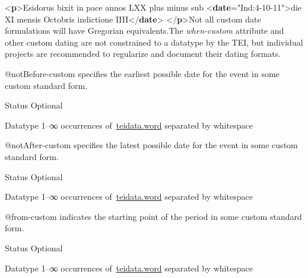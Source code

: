 \begin{reflist}
\begin{sansreflist}
\begin{reflist}
{<\textbf{p}>}Esidorus bixit in pace annos LXX plus minus sub\mbox{}\newline 
{<\textbf{date}\hspace*{1em}{when-custom}="{Ind:4-10-11}">}die XI mensis Octobris indictione IIII{</\textbf{date}>}\mbox{}\newline 
{</\textbf{p}>}Not all custom date formulations will have Gregorian equivalents.The {\itshape when-custom} attribute and other custom dating are not constrained to a datatype by the TEI, but individual projects are recommended to regularize and document their dating formats.
\end{reflist}  
    \item[@notBefore-custom]
  specifies the earliest possible date for the event in some custom standard form.
\begin{reflist}
    \item[{Status}]
  Optional
    \item[{Datatype}]
  1–∞ occurrences of \hyperref[TEI.teidata.word]{teidata.word} separated by whitespace
\end{reflist}  
    \item[@notAfter-custom]
  specifies the latest possible date for the event in some custom standard form.
\begin{reflist}
    \item[{Status}]
  Optional
    \item[{Datatype}]
  1–∞ occurrences of \hyperref[TEI.teidata.word]{teidata.word} separated by whitespace
\end{reflist}  
    \item[@from-custom]
  indicates the starting point of the period in some custom standard form.
\begin{reflist}
    \item[{Status}]
  Optional
    \item[{Datatype}]
  1–∞ occurrences of \hyperref[TEI.teidata.word]{teidata.word} separated by whitespace
    \item[]
\end{reflist}
\end{sansreflist}
\end{reflist}
